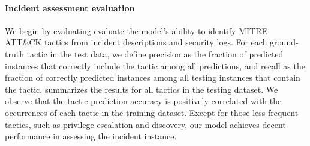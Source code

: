 \documentclass[sigconf]{acmart}
\begin{document}
\paragraph{Incident assessment evaluation} 
We begin by evaluating evaluate the model's ability to identify MITRE ATT\&CK tactics from incident descriptions and security logs. For each ground-truth tactic in the test data, we define precision as the fraction of predicted instances that correctly include the tactic among all predictions, and recall as the fraction of correctly predicted instances among all testing instances that contain the tactic.  summarizes the results for all tactics in the testing dataset. We observe that the tactic prediction accuracy is positively correlated with the occurrences of each tactic in the training dataset. Except for those less frequent tactics, such as privilege escalation and discovery, our model achieves decent performance in assessing the incident instance. 
\begin{table}
    \caption{Per-tactic MITRE ATT\&CK generation metrics on held-out incident assessment examples. }
    \label{tab:per-tactic}
\end{table}
\end{document}
